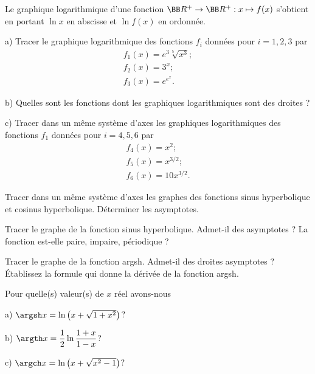 \documentclass[12pt,french,oneside,a4paper]{memoir} %
\begin{document}
\begin{exo}
Le graphique logarithmique d'une fonction
  $\BB R^+\rightarrow\BB R^+:x\mapsto f(x)$ s'obtient en portant $\ln
  x$ en abscisse et $\ln f(x)$ en ordonnée.
  
  a) Tracer le graphique logarithmique des fonctions $f_i$ données
  pour $i=1,2,3$ par
  \begin{equation*}
  \begin{array}{l}
  \displaystyle{f_1(x)=e^3\sqrt[5]{x^3}};\\[2mm]
  f_2(x)=3^x;\\[2mm]
  \displaystyle{f_3(x)=e^{e^x}}.
  \end{array}
\end{equation*}
  
  b) Quelles sont les fonctions dont les graphiques logarithmiques
  sont des droites ?
  
  c) Tracer dans un même système d'axes les graphiques
  logarithmiques des fonctions $f_1$ données pour $i=4,5,6$ par
  \begin{equation*}
  \begin{array}{l}
  f_4(x)=x^2;\\[2mm]
  f_5(x)=x^{3/2};\\[2mm]
  f_6(x)=10x^{3/2}.
  \end{array}
\end{equation*}
\end{exo}
\begin{exo}
Tracer dans un même système d'axes les graphes des fonctions
  sinus hyperbolique et cosinus hyperbolique. Déterminer les
  asymptotes.
\end{exo}
\begin{exo}
Tracer le graphe de la fonction sinus hyperbolique. Admet-il
  des asymptotes ? La fonction est-elle paire, impaire, périodique ?
\end{exo}
\begin{exo}
Tracer le graphe de la fonction argsh. Admet-il des droites
  asymptotes ? Établissez la formule qui donne la dérivée de la
  fonction argsh.
\end{exo}
\begin{exo}
Pour quelle(s) valeur(s) de $x$ réel avons-nous
  
  a) $\argsh x = \ln\left(x+\sqrt{1+x^2}\right)$?
  
  \vspace{2mm}
  
  b) $\argth x= \displaystyle{\frac{1}{2}\ln\frac{1+x}{1-x}}$?
  
  \vspace{2mm}
  
  c) $\argch x= \ln\left(x+\sqrt{x^2-1}\right)$?
\end{exo}
\end{document}
